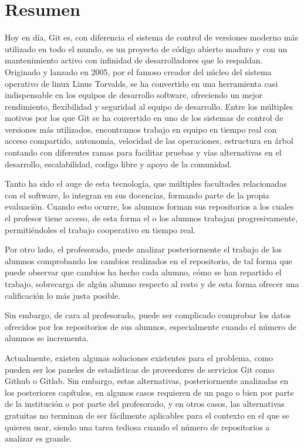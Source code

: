\chapter*{Resumen\label{00summary}}


Hoy en día, Git es, con diferencia el sistema de control de versiones
moderno más utilizado en todo el mundo, es un proyecto de código
abierto maduro y con un mantenimiento activo con infinidad de
desarrolladores que lo respaldan. Originado y lanzado en 2005, por el
famoso creador del núcleo del sistema operativo de linux Linus
Torvalds, se ha convertido en una herramienta casi indispensable en
los equipos de desarrollo software, ofreciendo un mejor rendimiento,
flexibilidad y seguridad al equipo de desarrollo. Entre los múltiples
motivos por los que Git se ha convertido en uno de los sistemas de
control de versiones más utilizados, encontramos trabajo en equipo en
tiempo real con acceso compartido, autonomía, velocidad de las
operaciones, estructura en árbol contando con diferentes ramas para
facilitar pruebas y vías alternativas en el desarrollo, escalabilidad,
codigo libre y apoyo de la comunidad.

Tanto ha sido el auge de esta tecnología, que múltiples facultades
relacionadas con el software, lo integran en sus docencias, formando
parte de la propia evaluación. Cuando esto ocurre, los alumnos forman
sus repositorios a los cuales el profesor tiene acceso, de esta forma
el o los alumnos trabajan progresivamente, permitiéndoles el trabajo
cooperativo en tiempo real.

Por otro lado, el profesorado, puede analizar posteriormente el
trabajo de los alumnos comprobando los cambios realizados en el
repositorio, de tal forma que puede observar que cambios ha hecho cada
alumno, cómo se han repartido el trabajo, sobrecarga de algún alumno
respecto al resto y de esta forma ofrecer una calificación lo más
justa posible.

Sin embargo, de cara al profesorado, puede ser complicado comprobar
los datos ofrecidos por los repositorios de sus alumnos, especialmente
cuando el número de alumnos se incrementa.

Actualmente, existen algunas soluciones existentes para el problema,
como pueden ser los paneles de estadísticas de proveedores de
servicios Git como Github o Gitlab. Sin embargo, estas alternativas,
posteriormente analizadas en los posteriores capítulos, en algunos
casos requieren de un pago o bien por parte de la institución o por
parte del profesorado, y en otros casos, las alternativas gratuitas no
terminan de ser fácilmente aplicables para el contexto en el que se
quieren usar, siendo una tarea tediosa cuando el número de
repositorios a analizar es grande.

